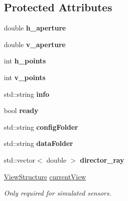 \subsection*{Protected Attributes}
\begin{DoxyCompactItemize}
\item 
double {\bfseries h\+\_\+aperture}\hypertarget{classRangeSensor_a333835abaf69fe389a6c4003a05025e9}{}\label{classRangeSensor_a333835abaf69fe389a6c4003a05025e9}

\item 
double {\bfseries v\+\_\+aperture}\hypertarget{classRangeSensor_a8a611c5adff94034e5d057cbfbd9b06e}{}\label{classRangeSensor_a8a611c5adff94034e5d057cbfbd9b06e}

\item 
int {\bfseries h\+\_\+points}\hypertarget{classRangeSensor_aa4bd70ed9a9ed097b0f1e0a1b63f7710}{}\label{classRangeSensor_aa4bd70ed9a9ed097b0f1e0a1b63f7710}

\item 
int {\bfseries v\+\_\+points}\hypertarget{classRangeSensor_ae41a872ce9c80fe142e03a245dd7e11b}{}\label{classRangeSensor_ae41a872ce9c80fe142e03a245dd7e11b}

\item 
std\+::string {\bfseries info}\hypertarget{classRangeSensor_a48ddb91baf886a7f69a23be2e24961d8}{}\label{classRangeSensor_a48ddb91baf886a7f69a23be2e24961d8}

\item 
bool {\bfseries ready}\hypertarget{classRangeSensor_a39b6258b5c2ea3cc92f64e85f2731fab}{}\label{classRangeSensor_a39b6258b5c2ea3cc92f64e85f2731fab}

\item 
std\+::string {\bfseries config\+Folder}\hypertarget{classRangeSensor_af275904c340a557cf90e623468deea8e}{}\label{classRangeSensor_af275904c340a557cf90e623468deea8e}

\item 
std\+::string {\bfseries data\+Folder}\hypertarget{classRangeSensor_a1c28d60485ff932cb00b838c27761918}{}\label{classRangeSensor_a1c28d60485ff932cb00b838c27761918}

\item 
std\+::vector$<$ double $>$ {\bfseries director\+\_\+ray}\hypertarget{classRangeSensor_a0a58e87804d43700b307eb7346be352c}{}\label{classRangeSensor_a0a58e87804d43700b307eb7346be352c}

\item 
\hyperlink{classViewStructure}{View\+Structure} \hyperlink{classRangeSensor_a35c0f1409284433393081ff9b048766d}{current\+View}\hypertarget{classRangeSensor_a35c0f1409284433393081ff9b048766d}{}\label{classRangeSensor_a35c0f1409284433393081ff9b048766d}

\begin{DoxyCompactList}\small\item\em Only required for simulated sensors. \end{DoxyCompactList}\end{DoxyCompactItemize}


